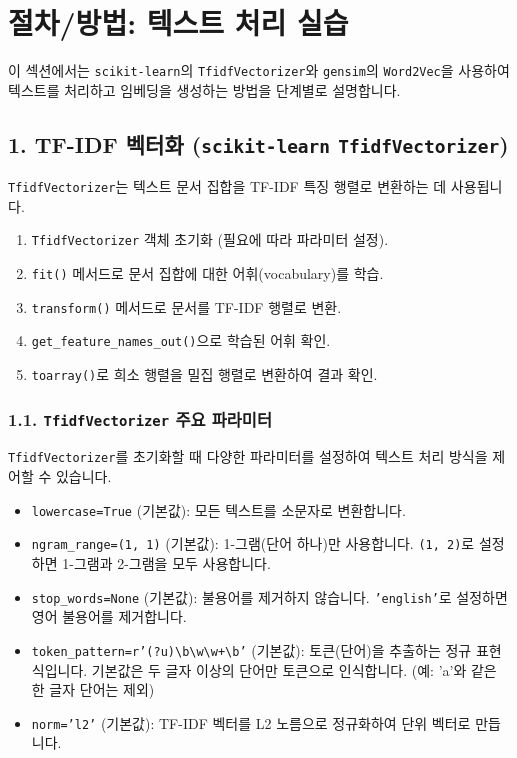\documentclass[11pt,a4paper]{article}
\theoremstyle{definition}
\newcommand{\newsection}[1]{\newpage\section{#1}}
\begin{document}
\newsection{절차/방법: 텍스트 처리 실습}

이 섹션에서는 \texttt{scikit-learn}의 \texttt{TfidfVectorizer}와 \texttt{gensim}의 \texttt{Word2Vec}을 사용하여 텍스트를 처리하고 임베딩을 생성하는 방법을 단계별로 설명합니다.

\subsection{1. TF-IDF 벡터화 (\texttt{scikit-learn} \texttt{TfidfVectorizer})}
\texttt{TfidfVectorizer}는 텍스트 문서 집합을 TF-IDF 특징 행렬로 변환하는 데 사용됩니다.

\begin{tcolorbox}[examplebox, title=📖 TF-IDF 벡터화 기본 절차]
\begin{enumerate}
    \item \texttt{TfidfVectorizer} 객체 초기화 (필요에 따라 파라미터 설정).
    \item \texttt{fit()} 메서드로 문서 집합에 대한 어휘(vocabulary)를 학습.
    \item \texttt{transform()} 메서드로 문서를 TF-IDF 행렬로 변환.
    \item \texttt{get\_feature\_names\_out()}으로 학습된 어휘 확인.
    \item \texttt{toarray()}로 희소 행렬을 밀집 행렬로 변환하여 결과 확인.
\end{enumerate}
\end{tcolorbox}

\subsubsection{1.1. \texttt{TfidfVectorizer} 주요 파라미터}
\texttt{TfidfVectorizer}를 초기화할 때 다양한 파라미터를 설정하여 텍스트 처리 방식을 제어할 수 있습니다.

\begin{itemize}
    \item \texttt{lowercase=True} (기본값): 모든 텍스트를 소문자로 변환합니다.
    \item \texttt{ngram\_range=(1, 1)} (기본값): 1-그램(단어 하나)만 사용합니다. \texttt{(1, 2)}로 설정하면 1-그램과 2-그램을 모두 사용합니다.
    \item \texttt{stop\_words=None} (기본값): 불용어를 제거하지 않습니다. \texttt{'english'}로 설정하면 영어 불용어를 제거합니다.
    \item \texttt{token\_pattern=r'(?u)\textbackslash{}b\textbackslash{}w\textbackslash{w}+\textbackslash{}b'} (기본값): 토큰(단어)을 추출하는 정규 표현식입니다. 기본값은 두 글자 이상의 단어만 토큰으로 인식합니다. (예: 'a'와 같은 한 글자 단어는 제외)
    \item \texttt{norm='l2'} (기본값): TF-IDF 벡터를 L2 노름으로 정규화하여 단위 벡터로 만듭니다.
\end{itemize}
\end{document}
